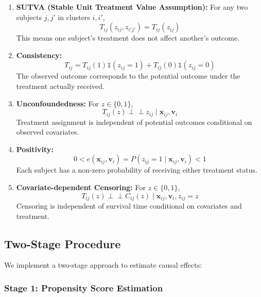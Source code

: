 \documentclass[useAMS,referee]{biom}
\begin{document}
\begin{enumerate}
\item \textbf{SUTVA (Stable Unit Treatment Value Assumption):} For any two subjects $j, j'$ in clusters $i, i'$,
   \begin{equation}
   T_{ij}(z_{ij}, z_{i'j'}) = T_{ij}(z_{ij})
   \end{equation}
   This means one subject's treatment does not affect another's outcome.

\item \textbf{Consistency:} 
   \begin{equation}
   T_{ij} = T_{ij}(1)\mathds{1}(z_{ij}=1) + T_{ij}(0)\mathds{1}(z_{ij}=0)
   \end{equation}
   The observed outcome corresponds to the potential outcome under the treatment actually received.

\item \textbf{Unconfoundedness:} For $z \in \{0,1\}$,
   \begin{equation}
   T_{ij}(z) \perp\!\!\!\perp z_{ij} \mid \mathbf{x}_{ij}, \mathbf{v}_i
   \end{equation}
   Treatment assignment is independent of potential outcomes conditional on observed covariates.

\item \textbf{Positivity:} 
   \begin{equation}
   0 < e(\mathbf{x}_{ij}, \mathbf{v}_i) = P(z_{ij}=1 \mid \mathbf{x}_{ij}, \mathbf{v}_i) < 1
   \end{equation}
   Each subject has a non-zero probability of receiving either treatment status.

\item \textbf{Covariate-dependent Censoring:} For $z \in \{0,1\}$,
   \begin{equation}
   T_{ij}(z) \perp\!\!\!\perp C_{ij}(z) \mid \mathbf{x}_{ij}, \mathbf{v}_i, z_{ij}=z
   \end{equation}
   Censoring is independent of survival time conditional on covariates and treatment.
\end{enumerate}

\subsection{Two-Stage Procedure}

We implement a two-stage approach to estimate causal effects:

\subsubsection{Stage 1: Propensity Score Estimation}
\end{document}
